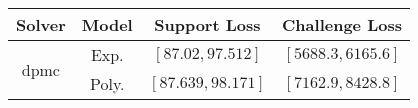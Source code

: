 \begin{tabular}{cc|c|c} 
\hline 
 Solver & Model & Support Loss  & Challenge Loss \tabularnewline\hline 
\hline 
\multirow{2}{*}{dpmc} & Exp. & $\mathbf{\left[87.02,97.512\right]}$ & $\mathbf{\left[5688.3,6165.6\right]}$ \tabularnewline 
 & Poly. & $\left[87.639,98.171\right]$ & $\left[7162.9,8428.8\right]$ \tabularnewline 
\hline 
\end{tabular} 

